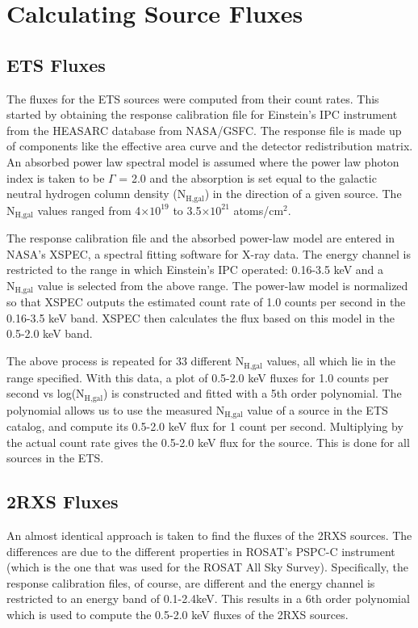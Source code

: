 \section{Calculating Source Fluxes}

\subsection{ETS Fluxes}

The fluxes for the ETS sources were computed from their count rates. 
This started by obtaining the response calibration file for Einstein’s IPC instrument from the HEASARC database from NASA/GSFC. 
The response file is made up of components like the effective area curve and the detector redistribution matrix. 
An absorbed power law spectral model is assumed where the power law photon index is taken to be $\Gamma$ = 2.0 and the absorption is set equal to the galactic neutral hydrogen column density ($\text{N}_{ \text{H,gal}  }$) in the direction of a given source. 
The $\text{N}_{ \text{H,gal}  }$ values ranged from 4$\times 10^{19}$ to 3.5$\times 10^{21}$ atoms/cm$^2$.

The response calibration file and the absorbed power-law model are entered in NASA’s XSPEC, a spectral fitting software for X-ray data. 
The energy channel is restricted to the range in which Einstein’s IPC operated: 0.16-3.5 keV and a $\text{N}_{ \text{H,gal}  }$ value is selected from the above range. 
The power-law model is normalized so that XSPEC outputs the estimated count rate of 1.0 counts per second in the 0.16-3.5 keV band. XSPEC then calculates the flux based on this model in the 0.5-2.0 keV band. 

The above process is repeated for 33 different $\text{N}_{ \text{H,gal}  }$ values, all which lie in the range specified. 
With this data, a plot of 0.5-2.0 keV fluxes for 1.0 counts per second vs log($\text{N}_{ \text{H,gal}  }$) is constructed and fitted with a 5th order polynomial.
The polynomial allows us to use the measured $\text{N}_{ \text{H,gal}  }$ value of a source in the ETS catalog, and compute its 0.5-2.0 keV flux for 1 count per second. 
Multiplying by the actual count rate gives the 0.5-2.0 keV flux for the source. 
This is done for all sources in the ETS.


\subsection{2RXS Fluxes}

An almost identical approach is taken to find the fluxes of the 2RXS sources. 
The differences are due to the different properties in ROSAT’s PSPC-C instrument (which is the one that was used for the ROSAT All Sky Survey). 
Specifically, the response calibration files, of course, are different and the energy channel is restricted to an energy band of 0.1-2.4keV.
This results in a 6th order polynomial which is used to compute the 0.5-2.0 keV fluxes of the 2RXS sources.



